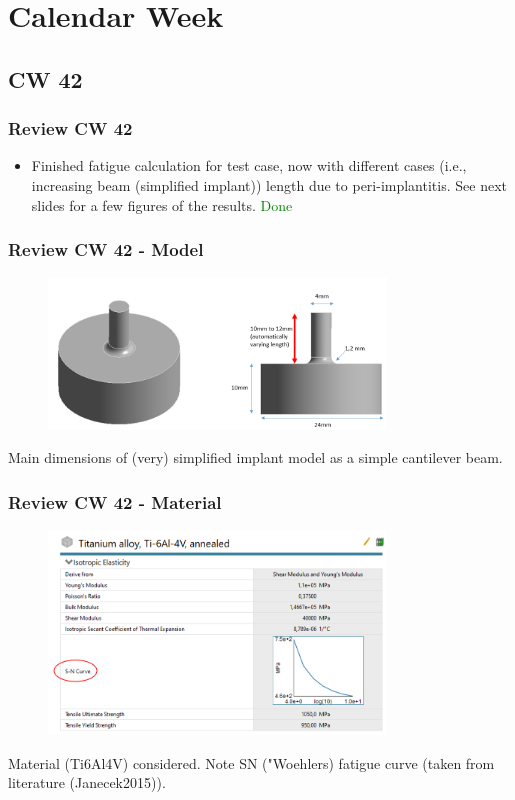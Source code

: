 \section{Calendar Week}
\subsection{CW 42}
\begin{frame}
  \frametitle{Review CW 42}
	\begin{itemize}
		\item Finished fatigue calculation for test case, now with different cases (i.e., increasing beam (simplified implant)) length due to peri-implantitis. See next slides for a few figures of the results. \textcolor{green}{Done}
	\end{itemize}
\end{frame}

\begin{frame}
  \frametitle{Review CW 42 - Model}
	\begin{figure}
		\includegraphics[width=0.8\textwidth]{pictures/CW42_1}
	\end{figure}
	\centering Main dimensions of (very) simplified implant model as a simple cantilever beam.
\end{frame}

\begin{frame}
  \frametitle{Review CW 42 - Material}
	\begin{figure}
		\includegraphics[width=0.8\textwidth]{pictures/CW42_2}
	\end{figure}
	\centering Material (Ti6Al4V) considered. Note SN ("Woehlers) fatigue curve (taken from literature (Janecek2015)).
\end{frame}

